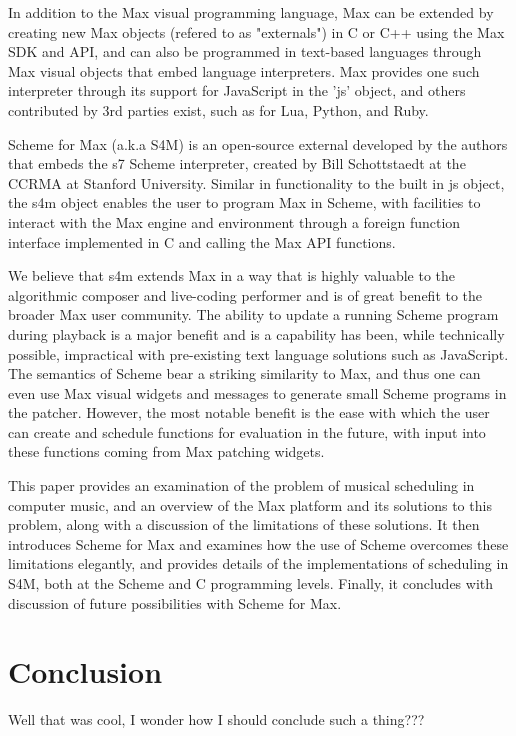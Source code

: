 \documentclass[acmsmall]{acmart}
\begin{document}
In addition to the Max visual programming language, Max can be extended
by creating new Max objects (refered to as "externals") in C or C++ 
using the Max SDK and API, and can also be programmed in text-based 
languages through Max visual objects that embed language
interpreters. Max provides one such interpreter through its support for 
JavaScript in the 'js' object, and others contributed by 3rd parties
exist, such as for Lua, Python, and Ruby. 

Scheme for Max (a.k.a S4M) is an open-source external developed by the 
authors that embeds the s7 Scheme interpreter, created by Bill Schottstaedt at
the CCRMA at Stanford University. Similar in functionality to the built
in js object, the s4m object enables the user to program Max in Scheme,
with facilities to interact with the Max engine and environment through
a foreign function interface implemented in C and calling the Max API functions.

We believe that s4m extends Max in a way that is highly valuable to 
the algorithmic composer and live-coding performer and is of great benefit
to the broader Max user community. The ability to update
a running Scheme program during playback is a major benefit
and is a capability has been, while technically possible, impractical
with pre-existing text language solutions such as JavaScript. The semantics
of Scheme bear a striking similarity to Max, and thus one can even use
Max visual widgets and messages to generate small Scheme programs in the
patcher. However, the most notable benefit is the ease with which the user 
can create and schedule functions for evaluation in the future, with 
input into these functions coming from Max patching widgets.

This paper provides an examination of the problem of musical scheduling
in computer music, and an overview of the Max platform and its solutions to this problem, 
along with a discussion of the limitations of these solutions.
It then introduces Scheme for Max and examines how the use of Scheme
overcomes these limitations elegantly, and provides details of
the implementations of scheduling in S4M, both at the Scheme and
C programming levels. Finally, it concludes with discussion of future
possibilities with Scheme for Max. 


\section{Conclusion}
Well that was cool, I wonder how I should conclude such a thing???
\end{document}
